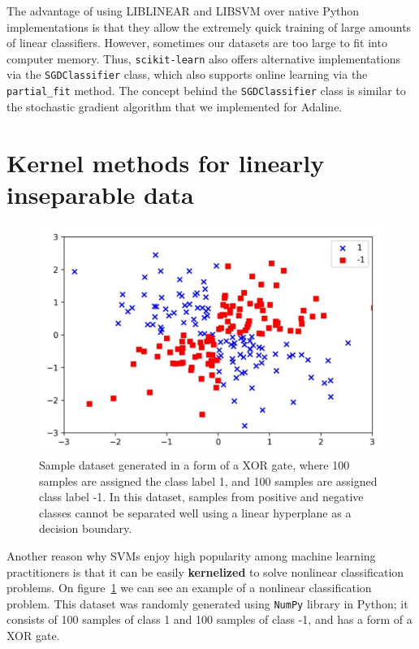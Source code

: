 \documentclass[11pt]{article}
\begin{document}
    The advantage of using LIBLINEAR and LIBSVM over native Python implementations is that they allow the extremely quick training of large amounts of linear classifiers.
    However, sometimes our datasets are too large to fit into computer memory.
    Thus, \texttt{scikit-learn} also offers alternative implementations via the \texttt{SGDClassifier} class, which also supports online learning via the \texttt{partial\_fit} method.
    The concept behind the \texttt{SGDClassifier} class is similar to the stochastic gradient algorithm that we implemented for Adaline.

    \section{Kernel methods for linearly inseparable data} \label{sec:kernel}

    \begin{figure}[hbt!]
        \centering
        \includegraphics[width=1\linewidth,trim=4 4 4 4,clip]{img/non_lin_data.png}
        \caption{Sample dataset generated in a form of a XOR gate, where 100 samples are assigned the class label 1, and 100 samples are assigned class label -1.
        In this dataset, samples from positive and negative classes cannot be separated well using a linear hyperplane as a decision boundary.}
        \label{fig:non_lin_data}
    \end{figure}

    Another reason why SVMs enjoy high popularity among machine learning practitioners is that it can be easily \textbf{kernelized} to solve nonlinear classification problems.
    On figure~\ref{fig:non_lin_data} we can see an example of a nonlinear classification problem.
    This dataset was randomly generated using \texttt{NumPy} library in Python;
    it consists of 100 samples of class 1 and 100 samples of class -1, and has a form of a XOR gate.
\end{document}
